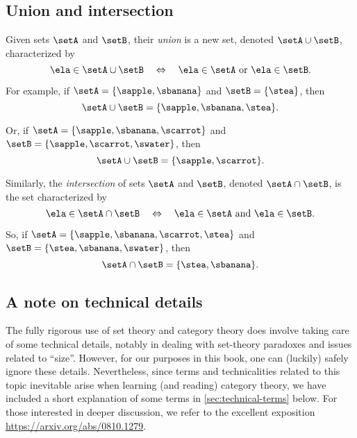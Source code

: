 \subsection{Union and intersection}

Given sets $\setA$ and $\setB$, their \emph{union} is a new set, denoted $\setA \cup \setB$, characterized by 
\begin{equation*}
\ela \in \setA \cup \setB \quad \Leftrightarrow \quad \ela \in \setA \ \text{or} \ \ela \in \setB. 
\end{equation*}

For example, if $\setA = \{ \sapple, \sbanana \}$ and $\setB = \{ \stea \}$, then 
\begin{equation*}
\setA \cup \setB = \{ \sapple, \sbanana, \stea \}. 
\end{equation*}

Or, if $\setA = \{ \sapple, \sbanana, \scarrot \}$ and $\setB = \{ \sapple, \scarrot, \swater \}$, then
\begin{equation*}
\setA \cup \setB = \{ \sapple, \scarrot \}. 
\end{equation*}

Similarly, the \emph{intersection} of sets $\setA$ and $\setB$, denoted $\setA \cap \setB$, is the set characterized by 
\begin{equation*}
\ela \in \setA \cap \setB \quad \Leftrightarrow \quad \ela \in \setA \ \text{and} \ \ela \in \setB. 
\end{equation*}

So, if $\setA = \{ \sapple, \sbanana, \scarrot, \stea \}$ and $\setB = \{ \stea, \sbanana, \swater \}$, then
\begin{equation*}
\setA \cap \setB = \{ \stea, \sbanana \}. 
\end{equation*}


\subsection{A note on technical details}

The fully rigorous use of set theory and category theory does involve taking care of some technical details, notably in dealing with set-theory paradoxes and issues related to ``size''.
However, for our purposes in this book, one can (luckily) safely ignore these details.
Nevertheless, since terms and technicalities related to this topic inevitable arise when learning (and reading) category theory, we have included a short explanation of some terms in \cref{sec:technical-terms} below.
For those interested in deeper discussion, we refer to the excellent exposition \url{https://arxiv.org/abs/0810.1279}.



